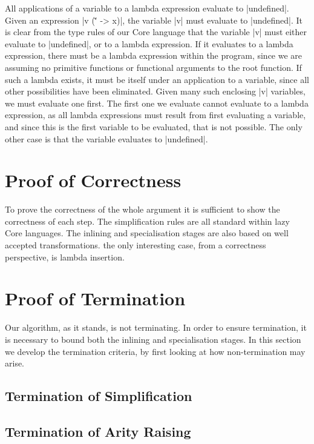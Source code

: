 \documentclass[preprint]{sigplanconf}
\begin{document}
\begin{lemma}{All applications of a variable to a lambda expression evaluate to |undefined|.}
Given an expression |v (\v' -> x)|, the variable |v| must evaluate to |undefined|. It is clear from the type rules of our Core language that the variable |v| must either evaluate to |undefined|, or to a lambda expression. If it evaluates to a lambda expression, there must be a lambda expression within the program, since we are assuming no primitive functions or functional arguments to the root function. If such a lambda exists, it must be itself under an application to a variable, since all other possibilities have been eliminated. Given many such enclosing |v| variables, we must evaluate one first. The first one we evaluate cannot evaluate to a lambda expression, as all lambda expressions must result from first evaluating a variable, and since this is the first variable to be evaluated, that is not possible. The only other case is that the variable evaluates to |undefined|.
\end{lemma}


\section{Proof of Correctness}

To prove the correctness of the whole argument it is sufficient to show the correctness of each step. The simplification rules are all standard within lazy Core languages. The inlining and specialisation stages are also based on well accepted transformations. the only interesting case, from a correctness perspective, is lambda insertion.


\section{Proof of Termination}
\label{sec:firstify_terminate}

Our algorithm, as it stands, is not terminating. In order to ensure termination, it is necessary to bound both the inlining and specialisation stages. In this section we develop the termination criteria, by first looking at how non-termination may arise.

\subsection{Termination of Simplification}


\subsection{Termination of Arity Raising}
\end{document}
